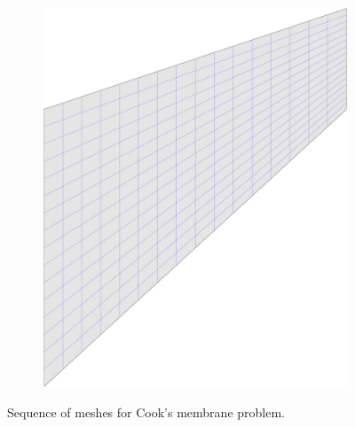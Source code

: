 \begin{figure}[htb!]
\begin{subfigure}[b]{0.18\linewidth}
        \includegraphics[width=\linewidth]{mesh_cook_4}
    \end{subfigure}
    \caption{Sequence of meshes for Cook's membrane problem.}
    \label{fig:mesh_cook}
\end{figure}

